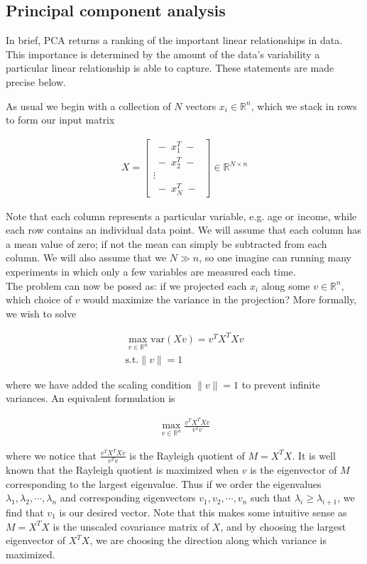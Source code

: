\subsection{Principal component analysis \label{sec:pca}}

In brief, PCA returns a ranking of the important linear relationships
in data. This importance is determined by the amount of the data's
variability a particular linear relationship is able to capture. These
statements are made precise below.

As usual we begin with a collection of $N$ vectors $x_i \in \mathbb{R}^n$,
which we stack in rows to form our input matrix

\begin{align}
  X = \begin{bmatrix} \; - \; x_1^T \; - \; \\ \; - \; x_2^T \; - \; \\ \vdots \\ \; - \; x_N^T
    \; - \; \end{bmatrix} \in \mathbb{R}^{N \times n}
\end{align}

Note that each column represents a particular variable, e.g. age or
income, while each row contains an individual data point. We will
assume that each column has a mean value of zero; if not the mean can
simply be subtracted from each column. We will also assume that we
$N \gg n$, so one imagine can running many experiments in which only a
few variables are measured each time. \\

The problem can now be posed as: if we projected each $x_i$ along some
$v \in \mathbb{R}^n$, which choice of $v$ would maximize the variance
in the projection? More formally, we wish to solve

\begin{align}
  \max_{v \in \mathbb{R}^n} \mathrm{var}(Xv) = v^TX^TXv \\
  \mathrm{s.t.} \| v \| = 1
\end{align}

where we have added the scaling condition $\| v \| = 1$ to prevent
infinite variances. An equivalent formulation is

\begin{align}
  \max_{v \in \mathbb{R}^n} \frac{v^TX^TXv}{v^Tv}
\end{align}

where we notice that $\frac{v^TX^TXv}{v^Tv}$ is the Rayleigh quotient
of $M = X^TX$. It is well known that the Rayleigh quotient is
maximized when $v$ is the eigenvector of $M$ corresponding to the
largest eigenvalue. Thus if we order the eigenvalues
$\lambda_1, \lambda_2, \cdots, \lambda_n$ and corresponding
eigenvectors $v_1, v_2, \cdots, v_n$ such that
$\lambda_i \ge \lambda_{i+1}$, we find that $v_1$ is our desired
vector. Note that this makes some intuitive sense as $M = X^TX$ is the
unscaled covariance matrix of $X$, and by choosing the largest
eigenvector of $X^TX$, we are choosing the direction along which
variance is maximized. \\

